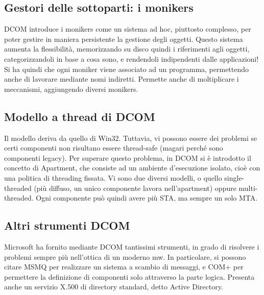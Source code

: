 \subsection{Gestori delle sottoparti: i monikers}
DCOM introduce i monikers come un sistema ad hoc, piuttosto complesso, per poter gestire in maniera persistente la 
gestione degli oggetti. Questo sistema aumenta la flessibilità, memorizzando su disco quindi i riferimenti agli oggetti,
categorizzandoli in base a cosa sono, e rendendoli indipendenti dalle applicazioni!
Si ha quindi che ogni moniker viene associato ad un programma, permettendo anche di lavorare mediante nomi indiretti. 
Permette anche di moltiplicare i meccanismi, aggiungendo diversi monikers.
\subsection{Modello a thread di DCOM}
Il modello deriva da quello di Win32. Tuttavia, vi possono essere dei problemi se certi componenti non risultano essere
thread-safe (magari perché sono componenti legacy). Per superare questo problema, in DCOM si è introdotto il concetto di 
Apartment, che consiste ad un ambiente d'esecuzione isolato, cioè con una politica di threading fissata. Vi sono due 
diversi modelli, o quello single-threaded (più diffuso, un unico componente lavora nell'apartment) oppure 
multi-threaded. Ogni componente può quindi avere più STA, ma sempre un solo MTA.
\subsection{Altri strumenti DCOM}
Microsoft ha fornito mediante DCOM tantissimi strumenti, in grado di risolvere i problemi sempre più nell'ottica di un 
moderno mw.
In particolare, si possono citare MSMQ per realizzare un sistema a scambio di messaggi, e COM+ per permettere la 
definizione di componenti solo attraverso la parte logica. Presenta anche un servizio X.500 di directory standard, detto
Active Directory.
